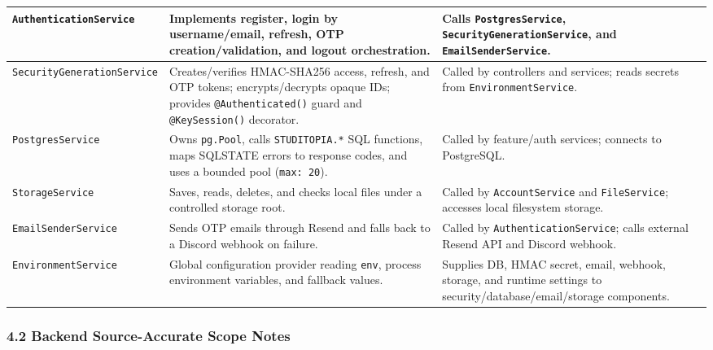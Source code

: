\documentclass[12pt]{article}
\begin{document}
\begin{longtable}{|>{\raggedright\arraybackslash}p{}|>{\raggedright\arraybackslash}p{}|>{\raggedright\arraybackslash}p{}|}
\texttt{AuthenticationService} & Implements register, login by username/email, refresh, OTP creation/validation, and logout orchestration. & Calls \texttt{PostgresService}, \texttt{SecurityGenerationService}, and \texttt{EmailSenderService}. \\ \hline
\texttt{SecurityGenerationService} & Creates/verifies HMAC-SHA256 access, refresh, and OTP tokens; encrypts/decrypts opaque IDs; provides \texttt{@Authenticated()} guard and \texttt{@KeySession()} decorator. & Called by controllers and services; reads secrets from \texttt{EnvironmentService}. \\ \hline
\texttt{PostgresService} & Owns \texttt{pg.Pool}, calls \texttt{STUDITOPIA.*} SQL functions, maps SQLSTATE errors to response codes, and uses a bounded pool (\texttt{max: 20}). & Called by feature/auth services; connects to PostgreSQL. \\ \hline
\texttt{StorageService} & Saves, reads, deletes, and checks local files under a controlled storage root. & Called by \texttt{AccountService} and \texttt{FileService}; accesses local filesystem storage. \\ \hline
\texttt{EmailSenderService} & Sends OTP emails through Resend and falls back to a Discord webhook on failure. & Called by \texttt{AuthenticationService}; calls external Resend API and Discord webhook. \\ \hline
\texttt{EnvironmentService} & Global configuration provider reading \texttt{env}, process environment variables, and fallback values. & Supplies DB, HMAC secret, email, webhook, storage, and runtime settings to security/database/email/storage components. \\ \hline
\end{longtable}
\endgroup
\par\medskip

\hypertarget{sec:4-2-backend-source-accurate-scope-notes}{}
\subsubsection*{4.2 Backend Source-Accurate Scope Notes}
\par\medskip
\end{document}
